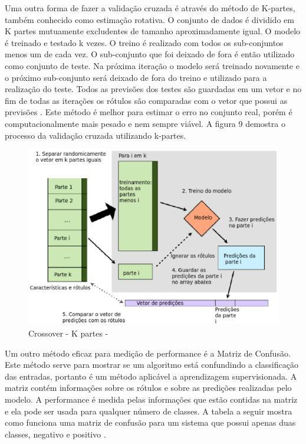 Uma outra forma de fazer a validação cruzada é através do método de K-partes, também conhecido como estimação rotativa. O conjunto de dados é dividido em K partes mutuamente excludentes de tamanho aproximadamente igual. O modelo é treinado e testado k vezes. O treino é realizado com todos os sub-conjuntos menos um de cada vez. O sub-conjunto que foi deixado de fora é então utilizado como conjunto de teste. Na próxima iteração o modelo será treinado novamente e o próximo sub-conjunto será deixado de fora do treino e utilizado para a realização do teste. Todos as previsões dos testes são guardadas em um vetor e no fim de todas as iterações os rótulos são comparadas com o vetor que possui as previsões \cite{astudy1995}. Este método  é melhor para estimar o erro no conjunto real, porém é computacionalmente mais pesado e nem sempre viável. A figura 9 demostra o processo da validação cruzada utilizando k-partes.

\begin{figure}[!h]
\centering
\includegraphics[keepaspectratio=true,scale=0.60]
{figuras/kfolds.eps}
\caption{Crossover - K partes - \cite{real2013}}
\label{over}
\end{figure}

Um outro método eficaz para medição de performance é a Matriz de Confusão. Este método serve para mostrar se um algoritmo está confundindo a classificação das entradas, portanto é um método aplicável a aprendizagem supervisionada. A matriz contém informações sobre os rótulos e sobre as predições realizadas pelo modelo. A performance é medida pelas informações que estão contidas na matriz e ela pode ser usada para qualquer número de classes. A tabela a seguir mostra como funciona uma matriz de confusão para um sistema que possui apenas duas classes, negativo e positivo \cite{howard2012}. 

